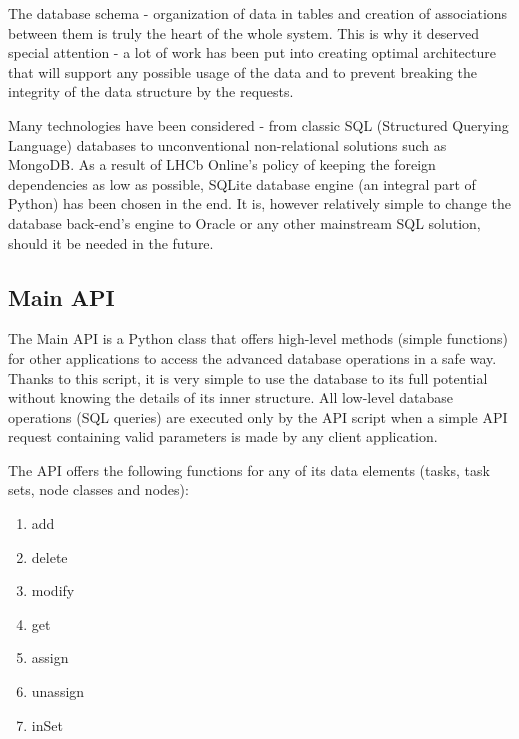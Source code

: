 \documentclass{customization}
\begin{document}
The database schema - organization of data in tables and creation of associations between them is truly the heart of the whole system. This is why it deserved special attention - a lot of work has been put into creating optimal architecture that will support any possible usage of the data and to prevent breaking the integrity of the data structure by the requests.
\newline

\noindent
Many technologies have been considered - from classic SQL (Structured Querying Language) databases to unconventional non-relational solutions such as MongoDB. As a result of LHCb Online's policy of keeping the foreign dependencies as low as possible, SQLite database engine (an integral part of Python) has been chosen in the end. It is, however relatively simple to change the database back-end's engine to Oracle or any other mainstream SQL solution, should it be needed in the future. 


\subsection{Main API}
\hspace{0.6cm}

The Main API is a Python class that offers high-level methods (simple functions) for other applications to access the advanced database operations in a safe way. Thanks to this script, it is very simple to use the database to its full potential without knowing the details of its inner structure. All low-level database operations (SQL queries) are executed only by the API script when a simple API request containing valid parameters is made by any client application.
\newline

\noindent
The API offers the following functions for any of its data elements (tasks, task sets, node classes and nodes):

\begin{multicols}{2}
    \begin{enumerate}
        \item add
        \item delete
        \item modify
        \item get
        \item assign
        \item unassign
        \item inSet
    \end{enumerate}
\end{multicols}
\end{document}
